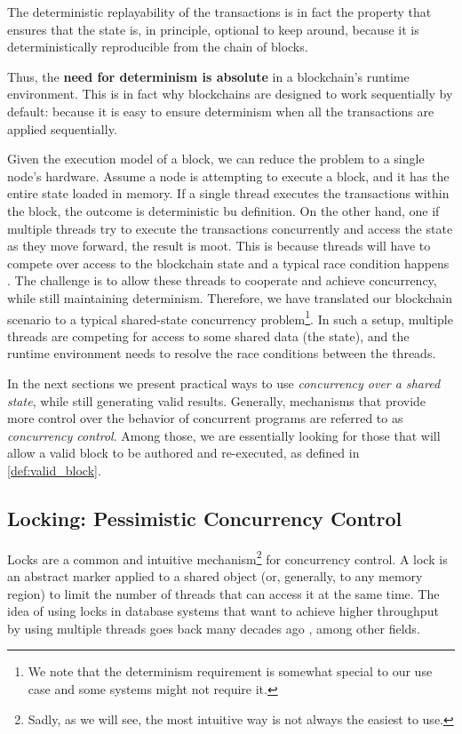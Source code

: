 \begin{remark}
	The deterministic replayability of the transactions is in fact the property that ensures that
	the state is, in principle, optional to keep around, because it is deterministically
	reproducible from the chain of blocks.
\end{remark}

Thus, the \textbf{need for determinism is absolute} in a blockchain's runtime environment. This is
in fact why blockchains are designed to work sequentially by default: because it is easy to ensure
determinism when all the transactions are applied sequentially.

Given the execution model of a block, we can reduce the problem to a single node's hardware. Assume
a node is attempting to execute a block, and it has the entire state loaded in memory. If a single
thread executes the transactions within the block, the outcome is deterministic bu definition. On
the other hand, one if multiple threads try to execute the transactions concurrently and access the
state as they move forward, the result is moot. This is because threads will have to compete over
access to the blockchain state and a typical race condition happens \cite{14:00-17:00ISOIEC9899}.
The challenge is to allow these threads to cooperate and achieve concurrency, while still
maintaining determinism. Therefore, we have translated our blockchain scenario to a typical
shared-state concurrency problem\footnote{We note that the determinism requirement is somewhat
special to our use case and some systems might not require it.}. In such a setup, multiple threads
are competing for access to some shared data (the state), and the runtime environment needs to
resolve the race conditions between the threads.

In the next sections we present practical ways to use \textit{concurrency over a shared state},
while still generating valid results. Generally, mechanisms that provide more control over the
behavior of concurrent programs are referred to as  \textit{concurrency control}. Among those, we
are essentially looking for those that will allow a valid block to be authored and re-executed, as
defined in \ref{def:valid_block}.

\subsection{Locking: Pessimistic Concurrency Control} \label{chap_bg:subsec:lock} Locks are a common
and intuitive mechanism\footnote{Sadly, as we will see, the most intuitive way is not always the
easiest to use.} for concurrency control. A lock is an abstract marker applied to a shared object
(or, generally, to any memory region) to limit the number of threads that can access it at the same
time. The idea of using locks in database systems that want to achieve higher throughput by using
multiple threads goes back many decades ago \cite{kedemControllingConcurrencyUsing1979,
morrisPerformanceAnalysisLocking1985}, among other fields.

